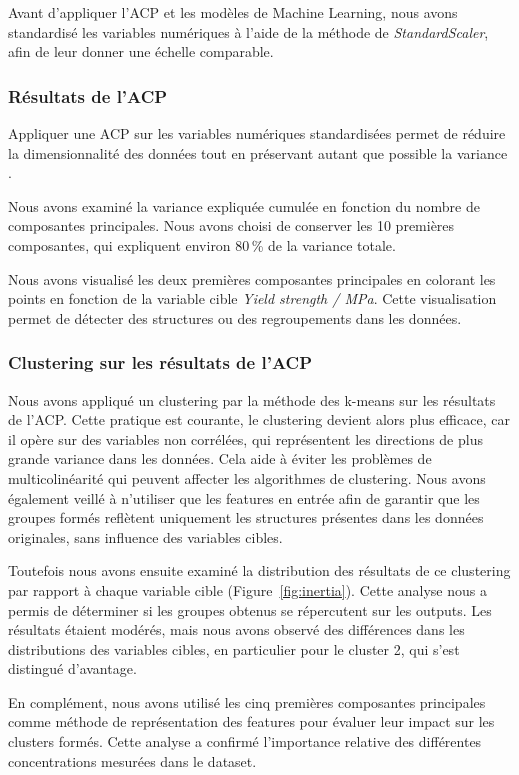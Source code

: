 \documentclass{article}
\newcommand{\bcite}[1]{\textbf{\cite{#1}}}
\begin{document}
Avant d'appliquer l'ACP et les modèles de Machine Learning, nous avons standardisé les variables numériques à l'aide de la méthode de \textit{StandardScaler}, afin de leur donner une échelle comparable.

\subsubsection{Résultats de l'ACP}

Appliquer une ACP sur les variables numériques standardisées permet de réduire la dimensionnalité des données tout en préservant autant que possible la variance \bcite{pca}.

Nous avons examiné la variance expliquée cumulée en fonction du nombre de composantes principales. Nous avons choisi de conserver les 10 premières composantes, qui expliquent environ 80\,\% de la variance totale.

Nous avons visualisé les deux premières composantes principales en colorant les points en fonction de la variable cible \textit{Yield strength / MPa}. Cette visualisation permet de détecter des structures ou des regroupements dans les données.

\subsubsection{Clustering sur les résultats de l'ACP}
Nous avons appliqué un clustering par la méthode des k-means sur les résultats de l'ACP. Cette pratique est courante, le clustering devient alors plus efficace, car il opère sur des variables non corrélées, qui représentent les directions de plus grande variance dans les données. Cela aide à éviter les problèmes de multicolinéarité qui peuvent affecter les algorithmes de clustering. Nous avons également veillé à n'utiliser que les features en entrée afin de garantir que les groupes formés reflètent uniquement les structures présentes dans les données originales, sans influence des variables cibles.

Toutefois nous avons ensuite examiné la distribution des résultats de ce clustering par rapport à chaque variable cible (Figure~\ref{fig:inertia}). Cette analyse nous a permis de déterminer si les groupes obtenus se répercutent sur les outputs. Les résultats étaient modérés, mais nous avons observé des différences dans les distributions des variables cibles, en particulier pour le cluster 2, qui s'est distingué d'avantage.

En complément, nous avons utilisé les cinq premières composantes principales comme méthode de représentation des features pour évaluer leur impact sur les clusters formés. Cette analyse a confirmé l'importance relative des différentes concentrations mesurées dans le dataset.\\
\end{document}

